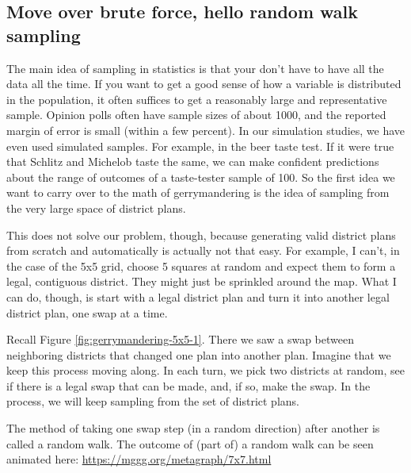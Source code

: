 \documentclass[
  openany]{book}
\begin{document}
\hypertarget{move-over-brute-force-hello-random-walk-sampling}{%
\subsection*{Move over brute force, hello random walk sampling}\label{move-over-brute-force-hello-random-walk-sampling}}

The main idea of sampling in statistics is that your don't have to have all the data all the time. If you want to get a good sense of how a variable is distributed in the population, it often suffices to get a reasonably large and representative sample. Opinion polls often have sample sizes of about 1000, and the reported margin of error is small (within a few percent). In our simulation studies, we have even used simulated samples. For example, in the beer taste test. If it were true that Schlitz and Michelob taste the same, we can make confident predictions about the range of outcomes of a taste-tester sample of 100. So the first idea we want to carry over to the math of gerrymandering is the idea of sampling from the very large space of district plans.

This does not solve our problem, though, because generating valid district plans from scratch and automatically is actually not that easy. For example, I can't, in the case of the 5x5 grid, choose 5 squares at random and expect them to form a legal, contiguous district. They might just be sprinkled around the map. What I can do, though, is start with a legal district plan and turn it into another legal district plan, one swap at a time.

Recall Figure \ref{fig:gerrymandering-5x5-1}. There we saw a swap between neighboring districts that changed one plan into another plan. Imagine that we keep this process moving along. In each turn, we pick two districts at random, see if there is a legal swap that can be made, and, if so, make the swap. In the process, we will keep sampling from the set of district plans.

The method of taking one swap step (in a random direction) after another is called a random walk. The outcome of (part of) a random walk can be seen animated here: \url{https://mggg.org/metagraph/7x7.html}
\end{document}
